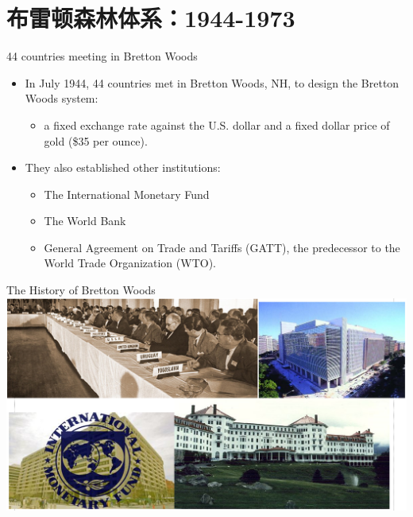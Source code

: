 \documentclass[10pt,hyperref={CJKbookmarks=true},xcolor=dvipsnames,aspectratio=169]{beamer}
\begin{document}
\section{布雷顿森林体系：1944-1973}
\begin{frame}{44 countries meeting in Bretton Woods}
	\begin{itemize}
		\item In July 1944, 44 countries met in Bretton Woods,
		NH, to design the Bretton Woods system:
		\begin{itemize}
			\item a fixed exchange rate against the U.S. dollar and a fixed
			dollar price of gold (\$35 per ounce).
		\end{itemize}
	\item They also established other institutions:
	\begin{itemize}
		\item The International Monetary Fund
		\item The World Bank
		\item General Agreement on Trade and Tariffs (GATT), the
		predecessor to the World Trade Organization (WTO).
	\end{itemize}
	\end{itemize}
\end{frame}

\begin{frame}{The History of Bretton Woods}
	\centering
	\includegraphics[scale=0.46]{fig/systems/bretton}
\end{frame}
\end{document}
